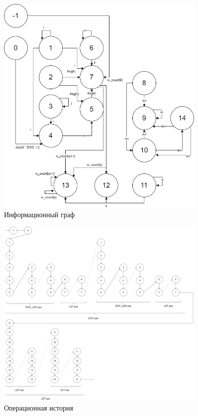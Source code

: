 \begin{figure}[h]
	\centering
	\includegraphics[width=0.9\textwidth]{img/dz-Информационный граф.drawio.png}
	\caption{Информационный граф}
	\label{fig:g2}
\end{figure}

\begin{figure}[h]
	\centering
	\includegraphics[width=0.9\textwidth]{img/dz-операционная история.drawio.png}
	\caption{Операционная история}
	\label{fig:g3}
\end{figure}

